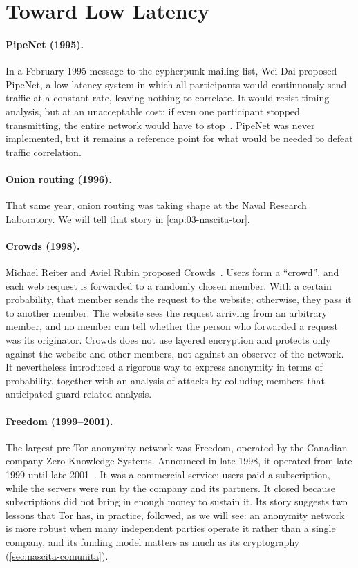 \section{Toward Low Latency}\label{sec:radici-bassa}

\paragraph{PipeNet (1995).} In a February 1995 message to the cypherpunk mailing list, Wei Dai proposed PipeNet, a low-latency system in which all participants would continuously send traffic at a constant rate, leaving nothing to correlate. It would resist timing analysis, but at an unacceptable cost: if even one participant stopped transmitting, the entire network would have to stop~\cite{syverson2011peel}. PipeNet was never implemented, but it remains a reference point for what would be needed to defeat traffic correlation.

\paragraph{Onion routing (1996).} That same year, onion routing was taking shape at the Naval Research Laboratory. We will tell that story in \cref{cap:03-nascita-tor}.

\paragraph{Crowds (1998).} Michael Reiter and Aviel Rubin proposed Crowds~\cite{reiter1998crowds}. Users form a \enquote{crowd}, and each web request is forwarded to a randomly chosen member. With a certain probability, that member sends the request to the website; otherwise, they pass it to another member. The website sees the request arriving from an arbitrary member, and no member can tell whether the person who forwarded a request was its originator. Crowds does not use layered encryption and protects only against the website and other members, not against an observer of the network. It nevertheless introduced a rigorous way to express anonymity in terms of probability, together with an analysis of attacks by colluding members that anticipated guard-related analysis.

\paragraph{Freedom (1999--2001).} The largest pre-Tor anonymity network was Freedom, operated by the Canadian company Zero-Knowledge Systems. Announced in late 1998, it operated from late 1999 until late 2001~\cite{syverson2011peel}. It was a commercial service: users paid a subscription, while the servers were run by the company and its partners. It closed because subscriptions did not bring in enough money to sustain it. Its story suggests two lessons that Tor has, in practice, followed, as we will see: an anonymity network is more robust when many independent parties operate it rather than a single company, and its funding model matters as much as its cryptography (\cref{sec:nascita-comunita}).

